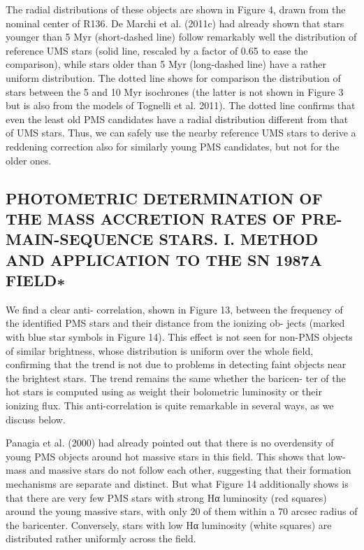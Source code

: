 \documentclass[../main.tex]{subfiles}
\begin{document}
{The radial distributions of these objects are shown in Figure 4, drawn from the nominal center of R136. De Marchi et al. (2011c) had already shown that stars younger than 5 Myr (short-dashed line) follow remarkably well the distribution of reference UMS stars (solid line, rescaled by a factor of 0.65 to ease the comparison), while stars older than 5 Myr (long-dashed line) have a rather uniform distribution. The dotted line shows for comparison the distribution of stars between the 5 and 10 Myr isochrones (the latter is not shown in Figure 3 but is also from the models of Tognelli et al. 2011). The dotted line confirms that even the least old PMS candidates have a radial distribution different from that of UMS stars. Thus, we can safely use the nearby reference UMS stars to derive a reddening correction also for similarly young PMS candidates, but not for the older ones.

\subsection{PHOTOMETRIC DETERMINATION OF THE MASS ACCRETION RATES OF PRE-MAIN-SEQUENCE STARS. I.
	METHOD AND APPLICATION TO THE SN 1987A FIELD∗}

We find a clear anti-
correlation, shown in Figure 13, between the frequency of the
identified PMS stars and their distance from the ionizing ob-
jects (marked with blue star symbols in Figure 14). This effect
is not seen for non-PMS objects of similar brightness, whose
distribution is uniform over the whole field, confirming that the
trend is not due to problems in detecting faint objects near the
brightest stars. The trend remains the same whether the baricen-
ter of the hot stars is computed using as weight their bolometric
luminosity or their ionizing flux. This anti-correlation is quite
remarkable in several ways, as we discuss below.

Panagia et al. (2000) had already pointed out that there is no
overdensity of young PMS objects around hot massive stars in
this field. This shows that low-mass and massive stars do not
follow each other, suggesting that their formation mechanisms
are separate and distinct. But what Figure 14 additionally shows
is that there are very few PMS stars with strong Hα luminosity
(red squares) around the young massive stars, with only 20%
of them within a 70 arcsec radius of the baricenter. Conversely,
stars with low Hα luminosity (white squares) are distributed
rather uniformly across the field.

}
\end{document}
